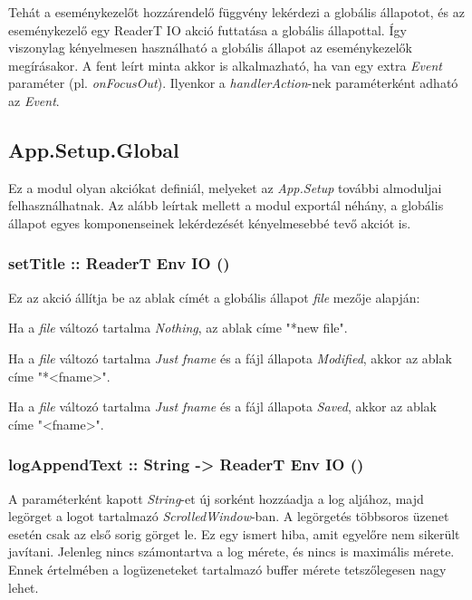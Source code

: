 Tehát a eseménykezelőt hozzárendelő függvény lekérdezi a globális állapotot, és az eseménykezelő egy ReaderT IO akció futtatása a globális állapottal. Így viszonylag kényelmesen használható a globális állapot az eseménykezelők megírásakor. A fent leírt minta akkor is alkalmazható, ha van egy extra \textit{Event} paraméter (pl. \textit{onFocusOut}).  Ilyenkor a \textit{handlerAction}-nek paraméterként adható az \textit{Event}.

\subsection{App.Setup.Global}

Ez a modul olyan akciókat definiál, melyeket az \textit{App.Setup} további almoduljai felhasználhatnak. Az alább leírtak mellett a modul exportál néhány, a globális állapot egyes komponenseinek lekérdezését kényelmesebbé tevő akciót is.

\subsubsection{setTitle :: ReaderT Env IO ()}

Ez az akció állítja be az ablak címét a globális állapot \textit{file} mezője alapján:
\begin{compactenum}
	\item Ha a \textit{file} változó tartalma \textit{Nothing}, az ablak címe "*new file".
	\item Ha a \textit{file} változó tartalma \textit{Just fname} és a fájl állapota \textit{Modified}, akkor az ablak címe "*<fname>".
	\item Ha a \textit{file} változó tartalma \textit{Just fname} és a fájl állapota \textit{Saved}, akkor az ablak címe "<fname>".
\end{compactenum}

\subsubsection{logAppendText :: String -> ReaderT Env IO ()}

A paraméterként kapott \textit{String}-et új sorként hozzáadja a log aljához, majd legörget a logot tartalmazó \textit{ScrolledWindow}-ban. A legörgetés többsoros üzenet esetén csak az első sorig görget le. Ez egy ismert hiba, amit egyelőre nem sikerült javítani. Jelenleg nincs számontartva a log mérete, és nincs is maximális mérete. Ennek értelmében a logüzeneteket tartalmazó buffer mérete tetszőlegesen nagy lehet.

